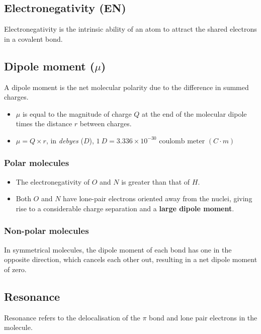 \documentclass[11pt]{article}
\begin{document}
\subsection{Electronegativity (EN)}
\label{sec:orgddeeb55}
Electronegativity is the intrinsic ability of an atom to attract the shared electrons in a covalent bond.
\subsection{Dipole moment (\(\mu\))}
\label{sec:orgdfd1263}
A dipole moment is the net molecular polarity due to the difference in summed charges.

\begin{itemize}
\item \(\mu\) is equal to the magnitude of charge \(Q\) at the end of the molecular dipole times the distance \(r\) between charges.
\item \(\mu = Q \times r\), in \emph{debyes} (\(D\)), \(\qty{1}{\unit{D}} = 3.336 \times 10^{-30} \text{ coulomb meter } (C \cdot m)\)
\end{itemize}
\subsubsection{Polar molecules}
\label{sec:orgfc9f2d8}
\begin{itemize}
\item The electronegativity of \(O\) and \(N\) is greater than that of \(H\).
\item Both \(O\) and \(N\) have lone-pair electrons oriented away from the nuclei, giving rise to a considerable charge separation and a \textbf{large dipole moment}.
\end{itemize}
\subsubsection{Non-polar molecules}
\label{sec:org972d7c5}
In symmetrical molecules, the dipole moment of each bond has one in the opposite direction, which cancels each other out, resulting in a net dipole moment of zero.
\subsection{Resonance}
\label{sec:orgc366b9e}
Resonance refers to the delocalisation of the \(\pi\) bond and lone pair electrons in the molecule.
\end{document}
